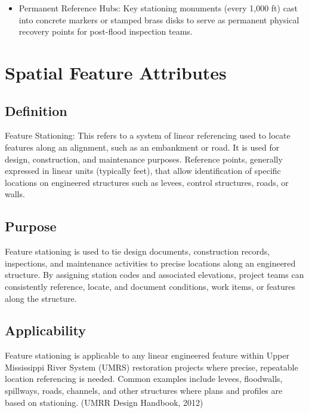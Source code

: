 \documentclass[
  letterpaper,
  DIV=11,
  numbers=noendperiod]{scrreprt}
\providecommand{\tightlist}{%
  \setlength{\itemsep}{0pt}\setlength{\parskip}{0pt}}
\begin{document}
\begin{itemize}
\tightlist
\item
  Permanent Reference Hubs: Key stationing monuments (every 1,000 ft)
  cast into concrete markers or stamped brass disks to serve as
  permanent physical recovery points for post-flood inspection teams.
\end{itemize}

\section{Spatial Feature Attributes}\label{spatial-feature-attributes-4}

\subsection{Definition}\label{definition-20}

Feature Stationing: This refers to a system of linear referencing used
to locate features along an alignment, such as an embankment or road. It
is used for design, construction, and maintenance purposes. Reference
points, generally expressed in linear units (typically feet), that allow
identification of specific locations on engineered structures such as
levees, control structures, roads, or walls.

\subsection{Purpose}\label{purpose-24}

Feature stationing is used to tie design documents, construction
records, inspections, and maintenance activities to precise locations
along an engineered structure. By assigning station codes and associated
elevations, project teams can consistently reference, locate, and
document conditions, work items, or features along the structure.

\subsection{Applicability}\label{applicability-21}

Feature stationing is applicable to any linear engineered feature within
Upper Mississippi River System (UMRS) restoration projects where
precise, repeatable location referencing is needed. Common examples
include levees, floodwalls, spillways, roads, channels, and other
structures where plans and profiles are based on stationing. (UMRR
Design Handbook, 2012)
\end{document}
